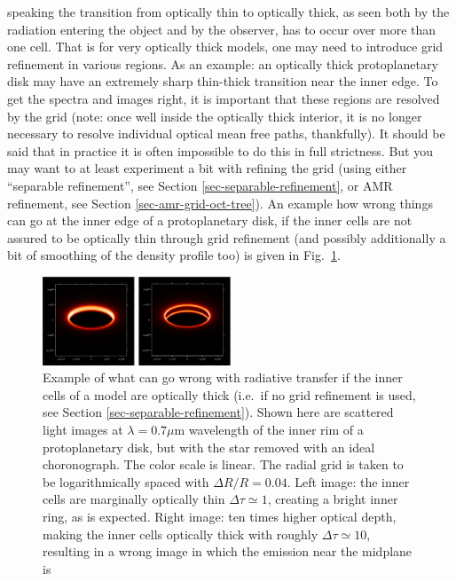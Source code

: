 \documentclass{report}
\begin{document}
\begin{enumerate}
  speaking the transition from optically thin to optically thick, as seen
  both by the radiation entering the object and by the observer, has to
  occur over more than one cell. That is for very optically thick models,
  one may need to introduce grid refinement in various regions. As an
  example: an optically thick protoplanetary disk may have an extremely
  sharp thin-thick transition near the inner edge. To get the spectra and
  images right, it is important that these regions are resolved by the grid
  (note: once well inside the optically thick interior, it is no longer
  necessary to resolve individual optical mean free paths, thankfully). It
  should be said that in practice it is often impossible to do this in full
  strictness. But you may want to at least experiment a bit with refining
  the grid (using either ``separable refinement'', see Section
  \ref{sec-separable-refinement}, or AMR refinement, see Section
  \ref{sec-amr-grid-oct-tree}). An example how wrong things can go at the
  inner edge of a protoplanetary disk, if the inner cells are not assured to
  be optically thin through grid refinement (and possibly additionally a bit
  of smoothing of the density profile too) is given in
  Fig.~\ref{fig-innerrim-lowres}.
  \begin{figure}
    \centerline{\includegraphics[width=0.5\textwidth]{XFIG/innerrim.eps}}
    \caption{\label{fig-innerrim-lowres}Example of what can go wrong with
      radiative transfer if the inner cells of a model are optically thick
      (i.e.\ if no grid refinement is used, see Section
      \ref{sec-separable-refinement}). Shown here are scattered light images
      at $\lambda=0.7\mu$m wavelength of the inner rim of a protoplanetary
      disk, but with the star removed with an ideal choronograph. The color
      scale is linear. The radial grid is taken to be logarithmically spaced
      with $\Delta R/R=0.04$.  Left image: the inner cells are marginally
      optically thin $\Delta\tau\simeq 1$, creating a bright inner ring, as
      is expected. Right image: ten times higher optical depth, making the
      inner cells optically thick with roughly $\Delta\tau\simeq 10$,
      resulting in a wrong image in which the emission near the midplane is
}
\end{figure}
\end{enumerate}
\end{document}
